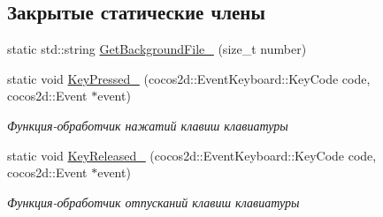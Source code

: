 \subsection*{Закрытые статические члены}
\begin{DoxyCompactItemize}
\item 
static std\+::string \hyperlink{classrtm_1_1_world_scene_a9e5a1d8ae0ce64055460755564e48d78}{Get\+Background\+File\+\_\+} (size\+\_\+t number)
\item 
\mbox{\label{classrtm_1_1_world_scene_aefb82a92ad3131fc4a6f722ffc492871}} 
static void \hyperlink{classrtm_1_1_world_scene_aefb82a92ad3131fc4a6f722ffc492871}{Key\+Pressed\+\_\+} (cocos2d\+::\+Event\+Keyboard\+::\+Key\+Code code, cocos2d\+::\+Event $\ast$event)
\begin{DoxyCompactList}\small\item\em Функция-\/обработчик нажатий клавиш клавиатуры \end{DoxyCompactList}\item 
\mbox{\label{classrtm_1_1_world_scene_af0c7e2ce255204096ba1547d06c126b3}} 
static void \hyperlink{classrtm_1_1_world_scene_af0c7e2ce255204096ba1547d06c126b3}{Key\+Released\+\_\+} (cocos2d\+::\+Event\+Keyboard\+::\+Key\+Code code, cocos2d\+::\+Event $\ast$event)
\begin{DoxyCompactList}\small\item\em Функция-\/обработчик отпусканий клавиш клавиатуры \end{DoxyCompactList}\end{DoxyCompactItemize}
